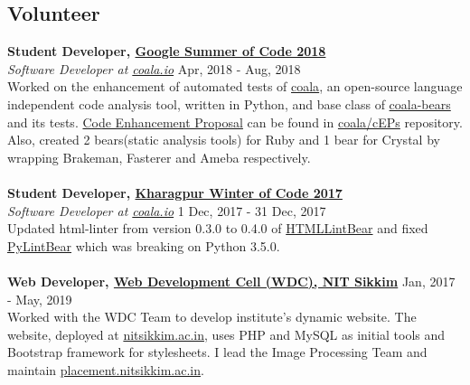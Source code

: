 \documentclass[margin, centered]{res}
\begin{document}
\begin{resume}
        \section{Volunteer}
            \textbf{Student Developer, \href{https://summerofcode.withgoogle.com/}{Google Summer of Code 2018}} \\
            \emph{Software Developer at \href{https://coala.io/}{coala.io}} \hfill Apr, 2018 - Aug, 2018 \\
            Worked on the enhancement of automated tests of \href{https://github.com/coala/coala}{coala},
            an open-source language independent code analysis tool, written in Python, and base
            class of \href{https://github.com/coala/coala-bears}{coala-bears} and its tests.
            \href{https://github.com/coala/cEPs/blob/master/cEP-0027.md}{Code Enhancement Proposal} can be found
            in \href{https://github.com/coala/cEPs}{coala/cEPs} repository. Also, created 2 bears(static analysis tools)
            for Ruby and 1 bear for Crystal by wrapping Brakeman, Fasterer and Ameba respectively. \\
            \\
            \textbf{Student Developer, \href{https://kwoc.kossiitkgp.in}{Kharagpur Winter of Code 2017}} \\
            \emph{Software Developer at \href{https://coala.io/}{coala.io}} \hfill 1 Dec, 2017 - 31 Dec, 2017 \\
            Updated html-linter from version 0.3.0 to 0.4.0 of
            \href{https://github.com/coala/coala-bears/pull/2148/commits/631ed37f7322fae7b9d7e16616f8c4009b9adb7e}{HTMLLintBear}
            and fixed \href{https://github.com/coala/coala-bears/blob/master/bears/python/PyLintBear.py}{PyLintBear} which was
            breaking on Python 3.5.0. \\
            \\
            \textbf{Web Developer, \href{https://nitsikkim.ac.in/webdevelopmentcell}{Web Development Cell (WDC), NIT Sikkim}} \hfill Jan, 2017 - May, 2019 \\
            Worked with the WDC Team to develop institute's dynamic website. The website, deployed at
            \href{https://www.nitsikkim.ac.in}{nitsikkim.ac.in}, uses PHP and MySQL as initial tools
            and Bootstrap framework for stylesheets. I lead the Image Processing Team and maintain
            \href{https://placement.nitsikkim.ac.in}{placement.nitsikkim.ac.in}.


\end{resume}
\end{document}
